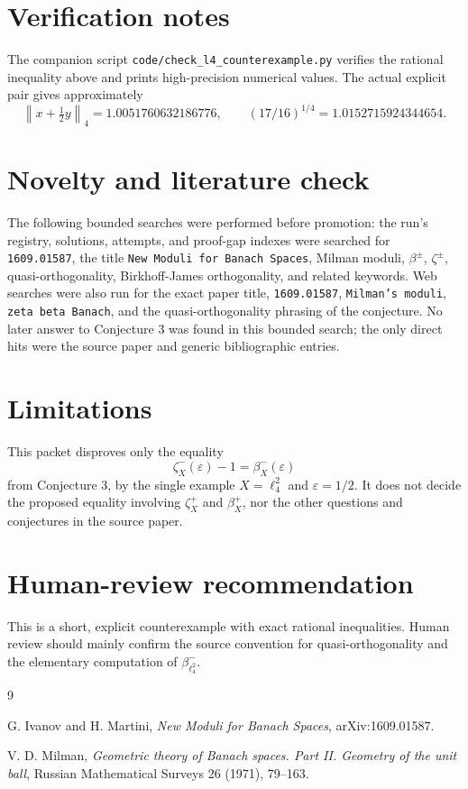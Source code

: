 \documentclass[11pt]{article}
\newcommand{\eps}{\varepsilon}
\newcommand{\norm}[1]{\left\lVert #1 \right\rVert}
\begin{document}
\section*{Verification notes}

The companion script \texttt{code/check\_l4\_counterexample.py} verifies the
rational inequality above and prints high-precision numerical values.  The
actual explicit pair gives approximately
\[
\norm{x+\tfrac12 y}_4=1.0051760632186776,
\qquad
(17/16)^{1/4}=1.0152715924344654.
\]

\section*{Novelty and literature check}

The following bounded searches were performed before promotion: the run's
registry, solutions, attempts, and proof-gap indexes were searched for
\texttt{1609.01587}, the title \texttt{New Moduli for Banach Spaces}, Milman
moduli, \(\beta^\pm\), \(\zeta^\pm\), quasi-orthogonality, Birkhoff-James
orthogonality, and related keywords.  Web searches were also run for the exact
paper title, \texttt{1609.01587}, \texttt{Milman's moduli}, \texttt{zeta beta
Banach}, and the quasi-orthogonality phrasing of the conjecture.  No later
answer to Conjecture 3 was found in this bounded search; the only direct hits
were the source paper and generic bibliographic entries.

\section*{Limitations}

This packet disproves only the equality
\[
\zeta^-_X(\eps)-1=\beta^-_X(\eps)
\]
from Conjecture 3, by the single example \(X=\ell_4^2\) and \(\eps=1/2\).  It
does not decide the proposed equality involving \(\zeta^+_X\) and
\(\beta^+_X\), nor the other questions and conjectures in the source paper.

\section*{Human-review recommendation}

This is a short, explicit counterexample with exact rational inequalities.
Human review should mainly confirm the source convention for
quasi-orthogonality and the elementary computation of \(\beta^-_{\ell_4^2}\).

\begin{thebibliography}{9}

G. Ivanov and H. Martini,
\emph{New Moduli for Banach Spaces},
arXiv:1609.01587.

V. D. Milman,
\emph{Geometric theory of Banach spaces. Part II. Geometry of the unit ball},
Russian Mathematical Surveys 26 (1971), 79--163.

\end{thebibliography}
\end{document}
